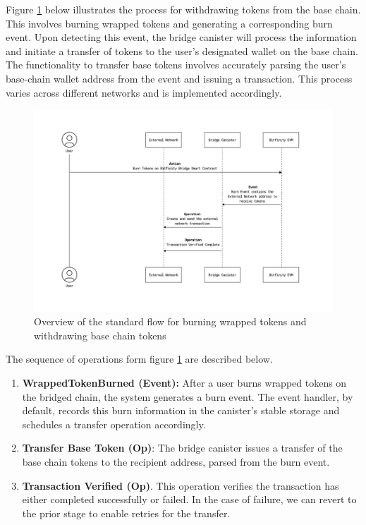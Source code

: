 \documentclass{article}
\begin{document}
Figure \ref{fig:standard_withdraw} below illustrates the process for withdrawing tokens from the base chain. This involves burning wrapped tokens and generating a corresponding burn event. Upon detecting this event, the bridge canister will process the information and initiate a transfer of tokens to the user's designated wallet on the base chain. The functionality to transfer base tokens involves accurately parsing the user's base-chain wallet address from the event and issuing a transaction. This process varies across different networks and is implemented accordingly.


\begin{figure}[H]
    \centering
    \includegraphics[width=1\textwidth]{standard_withdraw.png}
    \caption{Overview of the standard flow for burning wrapped tokens and withdrawing base chain tokens}
    \label{fig:standard_withdraw}
\end{figure}


The sequence of operations form figure \ref{fig:standard_withdraw} are described below.

    \begin{enumerate}  
        \item{\textbf{WrappedTokenBurned (Event):}} After a user burns wrapped tokens on the bridged chain, the system generates a burn event. The event handler, by default, records this burn information in the canister’s stable storage and schedules a transfer operation accordingly.
        
        \item \textbf{Transfer Base Token (Op)}: The bridge canister issues a transfer of the base chain tokens to the recipient address, parsed from the burn event. 

        \item \textbf{Transaction Verified (Op)}.  This operation verifies the transaction has either completed successfully or failed. In the case of failure, we can revert to the prior stage to enable retries for the transfer.  

 \end{enumerate}
\end{document}
